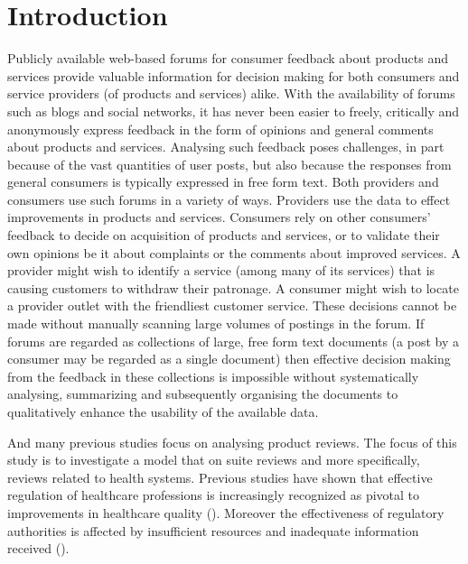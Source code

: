 \documentclass[11pt,twoside]{report}
\begin{document}
\chapter{Introduction}
Publicly available web-based
forums for consumer feedback about products and services 
provide valuable information for decision making for both consumers and
service providers (of products and services) alike. 
With the availability of forums such as blogs and social networks, 
it has never been easier to freely, critically and anonymously express 
feedback in the form of opinions and general comments about products and 
services.
Analysing such feedback poses challenges, in part because of the 
vast quantities of user posts, but also because the responses from general
consumers is typically expressed 
in free form text. Both providers and consumers use such forums in a variety 
of ways. Providers use the data to effect improvements in products and services.
Consumers rely on other consumers' feedback to decide on acquisition of
products and services, or to validate their own opinions be it about complaints
or the comments about improved services. A provider might wish to identify 
a service (among many of its services) that is causing customers to withdraw
their patronage. A consumer might wish to locate a provider outlet with the 
friendliest customer service.
These decisions cannot be made without manually scanning large volumes of 
postings in the forum. If forums are regarded as collections of large, free 
form text documents (a post by a consumer may be regarded as a single document)
then effective decision making from the feedback in these collections is
impossible without 
systematically analysing, summarizing and subsequently
organising the documents to qualitatively enhance the usability 
of the available data. 

And many previous studies focus on analysing product reviews. The focus of 
this study is to investigate a model that on suite reviews and more specifically, 
reviews related to health systems. Previous studies have shown that effective 
regulation of healthcare professions is increasingly recognized as pivotal to 
improvements in healthcare quality (\cite{ref6}). 
Moreover the effectiveness of regulatory authorities is affected by 
insufficient resources and inadequate information received (\cite{ref5}). 
\end{document}
